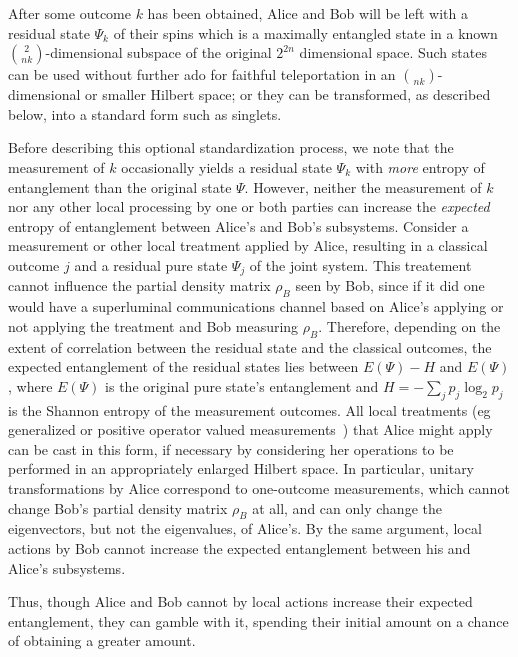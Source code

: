 After some outcome $k$ has been obtained, Alice and Bob will be left
with a residual state $\Psi_k$ of their spins which is a maximally
entangled state in a known $2\choose{n}{k}$-dimensional subspace of the
original $2^{2n}$ dimensional space.  Such states can be used without
further ado for faithful teleportation in an $\choose{n}{k}$-dimensional
or smaller Hilbert space; or they can be transformed, as described
below, into a standard form such as singlets.
 
Before describing this optional standardization process, we note that
the measurement of $k$ occasionally yields a residual state $\Psi_k$
with {\em more\/} entropy of entanglement than the original state
$\Psi$.  However, neither the measurement of $k$ nor any other local
processing by one or both parties can increase the {\em expected\/}
entropy of entanglement between Alice's and Bob's subsystems.  Consider
a measurement or other local treatment applied by Alice, resulting in a
classical outcome $j$ and a residual pure state $\Psi_j$ of the joint
system.  This treatement cannot influence the partial density matrix
$\rho_B$ seen by Bob, since if it did one would have a superluminal
communications channel based on Alice's applying or not applying the
treatment and Bob measuring $\rho_B$. Therefore, depending on the extent
of correlation between the residual state and the classical outcomes,
the expected entanglement of the residual states lies between $E(\Psi) -
H$ and $E(\Psi)$, where $E(\Psi)$ is the original pure state's
entanglement and $H=-\sum_jp_j\log_2p_j$ is the Shannon entropy of the
measurement outcomes.  All local treatments (eg generalized or positive
operator valued measurements~\cite{Helstrom}) that Alice might apply can be cast
in this form, if
necessary by considering her operations to be performed in an
appropriately enlarged Hilbert space.  In particular, unitary
transformations by Alice correspond to one-outcome measurements, which
cannot change Bob's partial density matrix $\rho_B$ at all, and can only
change the eigenvectors, but not the eigenvalues, of Alice's.  By the
same argument, local actions by Bob cannot increase the expected
entanglement between his and Alice's subsystems.

Thus, though Alice and Bob cannot by local actions increase their
expected entanglement, they can gamble with it, spending their initial
amount on a chance of obtaining a greater amount.

